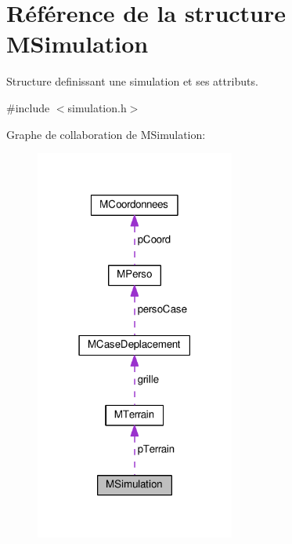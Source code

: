 \hypertarget{structMSimulation}{}\section{Référence de la structure M\+Simulation}
\label{structMSimulation}


Structure definissant une simulation et ses attributs.  




{\ttfamily \#include $<$simulation.\+h$>$}



Graphe de collaboration de M\+Simulation\+:\nopagebreak
\begin{figure}[H]
\begin{center}
\leavevmode
\includegraphics[width=186pt]{structMSimulation__coll__graph}
\end{center}
\end{figure}

